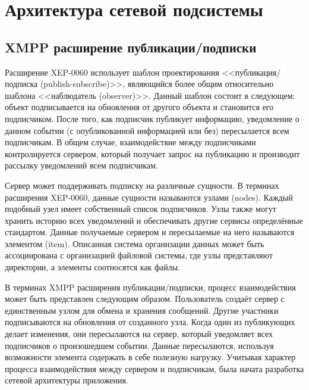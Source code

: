 \section{Архитектура сетевой подсистемы}
\subsection{XMPP расширение публикации/подписки}
Расширение XEP-0060 использует шаблон проектирования <<публикация/подписка
(publish-subscribe)>>, являющийся более общим относительно шаблона <<наблюдатель
(observer)>>. Данный шаблон состоит в следующем: объект подписывается на
обновления от другого объекта и становится его подписчиком. После того, как
подписчик публикует информацию, уведомление о данном событии (с опубликованной
информацией или без) пересылается всем подписчикам. В общем случае,
взаимодействие между подписчиками контролируется сервером, который получает
запрос на публикацию и производит рассылку уведомлений всем подписчикам.

Сервер может поддерживать подписку на различные сущности. В терминах расширения
XEP-0060, данные сущности называются узлами (nodes). Каждый подобный узел имеет
собственный список подписчиков. Узлы также могут хранить историю всех
уведомлений и обеспечивать другие сервисы определённые стандартом. Данные
получаемые сервером и пересылаемые на него называются элементом (item).
Описанная система организации данных может быть ассоциирована с организацией
файловой системы, где узлы представляют директории, а элементы соотносятся как
файлы.

В терминах XMPP расширения публикации/подписки, процесс взаимодействия может
быть представлен следующим образом. Пользователь создаёт сервер с единственным
узлом для обмена и хранения сообщений. Другие участники подписываются на
обновления от созданного узла. Когда один из публикующих делает изменения, они
пересылаются на сервер, который уведомляет всех подписчиков о произошедшем
событии. Данные пересылаются, используя возможности элемента содержать в себе
полезную нагрузку. Учитывая характер процесса взаимодействия между сервером и
подписчикам, была начата разработка сетевой архитектуры приложения.

